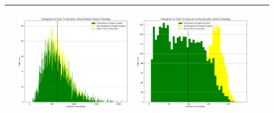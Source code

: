 \begin{landscape}
\begin{table}[h!]
\begin{tabular}{ | c | c | c | c | c |}
\begin{minipage}[c][52mm][c]{49mm}
    \end{minipage}
    &
    \begin{minipage}[c][52mm][c]{49mm}
      \includegraphics[width=49mm, height=49mm]{Chapters/MultiAgentTargetDetection/Figs/Histograms/VaryingPrior/Uniform/UniformRandomHistogram.png}
    \end{minipage}
    &
    \begin{minipage}[c][52mm][c]{49mm}
      \includegraphics[width=49mm, height=49mm]{Chapters/MultiAgentTargetDetection/Figs/Histograms/VaryingPrior/Uniform/UniformSaccadicHistogram.png}
    \end{minipage}
    \\
    \hline
   
  \end{tabular}
  \label{table:HistVaryingPriorDist}
\end{table}

\break


\vspace*{\fill}

\end{landscape}
